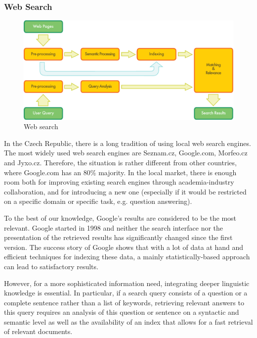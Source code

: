 \begin{multicols}{2}
\subsubsection{Web Search}

\begin{figure}[htb]
  \center
  \includegraphics[width=\textwidth]{../_media/english/web_search_architecture}
  \caption{Web search}
  \label{fig:websearcharch_en}
 \end{figure}

In the Czech Republic, there is a long tradition of using local web search engines. The most widely used web search engines are Seznam.cz, Google.com, Morfeo.cz and Jyxo.cz. Therefore, the situation is rather different from other countries, where Google.com has an 80\% majority. In the local market, there is enough room both for improving existing search engines through academia-industry collaboration, and for introducing a new one (especially if it would be restricted on a specific domain or specific task, e.g. question answering).

To the best of our knowledge, Google's results are considered to be the most relevant. Google started in 1998 and neither the search interface nor the presentation of the retrieved results has significantly changed since the first version. The success story of Google shows that with a lot of data at hand and efficient techniques for indexing these data, a mainly statistically-based approach can lead to satisfactory results.

However, for a more sophisticated information need, integrating deeper linguistic knowledge is essential. In particular, if a search query consists of a question or a complete sentence rather than a list of keywords, retrieving relevant answers to this query requires an analysis of this question or sentence on a syntactic and semantic level as well as the availability of an index that allows for a fast retrieval of relevant documents.


\end{multicols}
